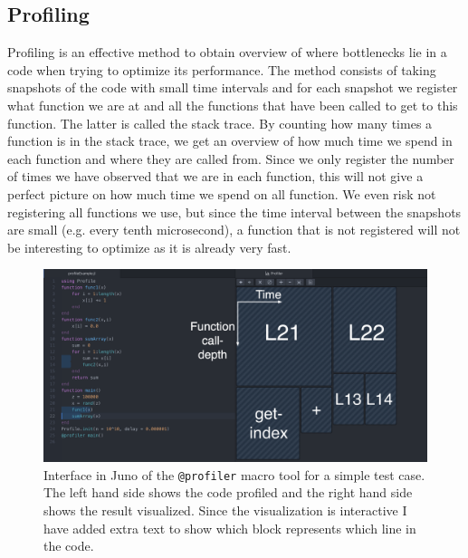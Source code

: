 \subsection{Profiling}
\label{sec:profiling}
Profiling is an effective method to obtain overview of where bottlenecks lie in a code when trying to optimize its performance. The method consists of taking snapshots of the code with small time intervals and for each snapshot we register what function we are at and all the functions that have been called to get to this function. The latter is called the stack trace. By counting how many times a function is in the stack trace, we get an overview of how much time we spend in each function and where they are called from. Since we only register the number of times we have observed that we are in each function, this will not give a perfect picture on how much time we spend on all function. We even risk not registering all functions we use, but since the time interval between the snapshots are small (e.g. every tenth microsecond), a function that is not registered will not be interesting to optimize as it is already very fast. 
\begin{figure}[htb]
    \centering
    \includegraphics[width = \textwidth]{figures/profiling_screenshot.png}
    \caption{Interface in Juno of the \texttt{@profiler} macro tool for a simple test case. The left hand side shows the code profiled and the right hand side shows the result visualized. Since the visualization is interactive I have added extra text to show which block represents which line in the code.}
    \label{fig:profilingExample}
\end{figure}

